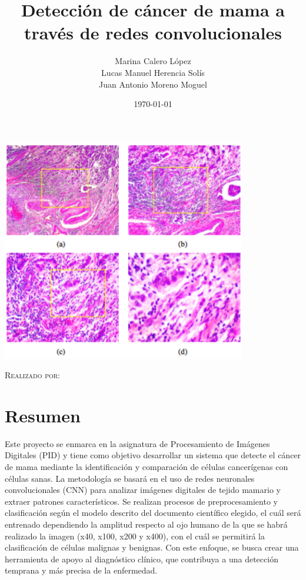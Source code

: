 \documentclass[12pt]{article} %
\title{Detección de cáncer de mama a través de redes convolucionales}
\author{Marina Calero López \\
Lucas Manuel Herencia Solís \\
Juan Antonio Moreno Moguel \\
}
\date{\today}
\newcommand{\customtitlefont}{\fontsize{40pt}{42pt}\selectfont\bfseries} %
\begin{document}
\begin{titlepage}
    \centering
    {\customtitlefont \thetitle \par} %
    \vspace{2cm}
    \includegraphics[width=0.8\textwidth]{logo.png}\par\vspace{1cm} %
    {\scshape\Large Realizado por:\par}
    \vspace{1cm}
    {\Large \theauthor\par}
    \vfill
    {\large \thedate\par}
\end{titlepage}

\section*{Resumen}
Este proyecto se enmarca en la asignatura de Procesamiento de Imágenes Digitales (PID) y tiene como objetivo desarrollar un sistema que detecte el cáncer de mama mediante la identificación y comparación de células cancerígenas con células sanas. La metodología se basará en el uso de redes neuronales convolucionales (CNN) para analizar imágenes digitales de tejido mamario y extraer patrones característicos. Se realizan procesos de preprocesamiento y clasificación según el modelo descrito del documento científico elegido, el cuál será entrenado dependiendo la amplitud respecto al ojo humano de la que se habrá realizado la imagen (x40, x100, x200 y x400), con el cuál se permitirá la clasificación de células malignas y benignas. Con este enfoque, se busca crear una herramienta de apoyo al diagnóstico clínico, que contribuya a una detección temprana y más precisa de la enfermedad.
\end{document}
